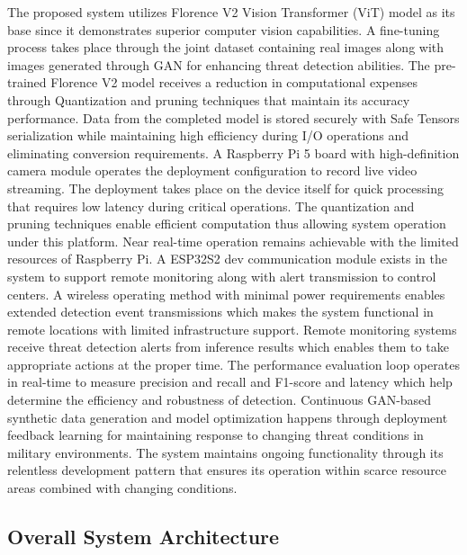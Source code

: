 \documentclass[fleqn,10pt,lineno]{wlpeerj}
\begin{document}
The proposed system utilizes Florence V2 Vision Transformer (ViT) model as its base since it demonstrates superior computer vision capabilities. A fine-tuning process takes place through the joint dataset containing real images along with images generated through GAN for enhancing threat detection abilities. The pre-trained Florence V2 model receives a reduction in computational expenses through Quantization and pruning techniques that maintain its accuracy performance. Data from the completed model is stored securely with Safe Tensors serialization while maintaining high efficiency during I/O operations and eliminating conversion requirements. A Raspberry Pi 5 board with high-definition camera module operates the deployment configuration to record live video streaming. The deployment takes place on the device itself for quick processing that requires low latency during critical operations. The quantization and pruning techniques enable efficient computation thus allowing system operation under this platform. Near real-time operation remains achievable with the limited resources of Raspberry Pi. A ESP32S2 dev communication module exists in the system to support remote monitoring along with alert transmission to control centers. A wireless operating method with minimal power requirements enables extended detection event transmissions which makes the system functional in remote locations with limited infrastructure support. Remote monitoring systems receive threat detection alerts from inference results which enables them to take appropriate actions at the proper time. The performance evaluation loop operates in real-time to measure precision and recall and F1-score and latency which help determine the efficiency and robustness of detection. Continuous GAN-based synthetic data generation and model optimization happens through deployment feedback learning for maintaining response to changing threat conditions in military environments. The system maintains ongoing functionality through its relentless development pattern that ensures its operation within scarce resource areas combined with changing conditions. 

\subsection{Overall System Architecture}
\end{document}
